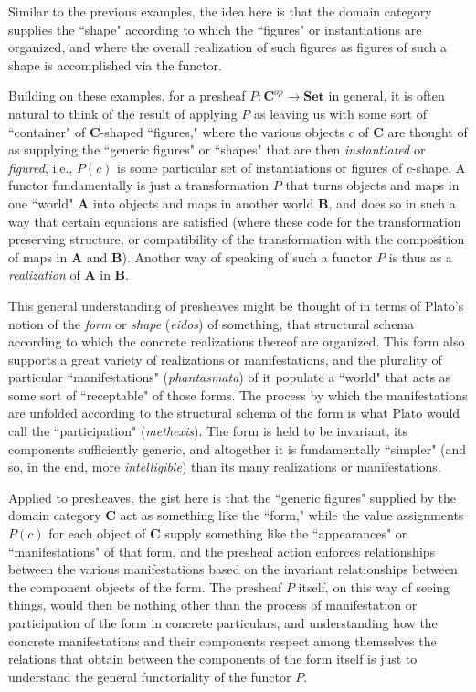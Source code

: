 \documentclass[a4paper]{book}
\theoremstyle{definition}
\theoremstyle{definition}
\theoremstyle{definition}
\theoremstyle{theorem}
\theoremstyle{definition}
\begin{document}
Similar to the previous examples, the idea here is that the domain category supplies the ``shape" according to which the ``figures" or instantiations are organized, and where the overall realization of such figures as figures of such a shape is accomplished via the functor. \par 
Building on these examples, for a presheaf $P: \textbf{C}^{op} \rightarrow \textbf{Set}$ in general, it is often natural to think of the result of applying $P$ as leaving us with some sort of ``container" of $\textbf{C}$-shaped ``figures," where the various objects $c$ of \textbf{C} are thought of as supplying the ``generic figures" or ``shapes" that are then \textit{instantiated} or \textit{figured}, i.e., $P(c)$ is some particular set of instantiations or figures of $c$-shape. 
A functor fundamentally is just a transformation $P$ that turns objects and maps in one ``world" $\textbf{A}$ into objects and maps in another world $\textbf{B}$, and does so in such a way that certain equations are satisfied (where these code for the transformation preserving structure, or compatibility of the transformation with the composition of maps in $\textbf{A}$ and $\textbf{B}$). Another way of speaking of such a functor $P$ is thus as a \textit{realization} of $\textbf{A}$ in $\textbf{B}$. \par   
This general understanding of presheaves might be thought of in terms of Plato's notion of the \textit{form} or \textit{shape} (\textit{eidos}) of something, that structural schema according to which the concrete realizations thereof are organized. This form also supports a great variety of realizations or manifestations, and the plurality of particular ``manifestations" (\textit{phantasmata}) of it populate a ``world" that acts as some sort of ``receptable" of those forms. The process by which the manifestations are unfolded according to the structural schema of the form is what Plato would call the ``participation" (\textit{methexis}). The form is held to be invariant, its components sufficiently generic, and altogether it is fundamentally ``simpler" (and so, in the end, more \textit{intelligible}) than its many realizations or manifestations. \par 
Applied to presheaves, the gist here is that the ``generic figures" supplied by the domain category \textbf{C} act as something like the ``form," while the value assignments $P(c)$ for each object of \textbf{C} supply something like the ``appearances" or ``manifestations" of that form, and the presheaf action enforces relationships between the various manifestations based on the invariant relationships between the component objects of the form. The presheaf $P$ itself, on this way of seeing things, would then be nothing other than the process of manifestation or participation of the form in concrete particulars, and understanding how the concrete manifestations and their components respect among themselves the relations that obtain between the components of the form itself is just to understand the general functoriality of the functor $P$.  
\end{document}
